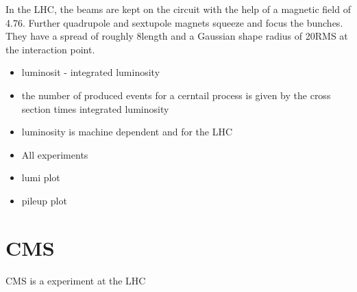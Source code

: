In the LHC, the beams are kept on the circuit with the help of a magnetic field of 4.76\tesla.
Further quadrupole and sextupole magnets squeeze and focus the bunches.
They have a spread of roughly 8\cm length and a Gaussian shape radius of 20\mum RMS at the interaction point.



\begin{itemize}
\item luminosit - integrated luminosity
\item the number of produced events for a cerntail process is given by the cross section times integrated luminosity
\item  luminosity is machine dependent and for the LHC
\item All experiments
\item lumi plot
\item pileup plot
\end{itemize}




\FloatBarrier
\chapter{CMS}

CMS is a experiment at the LHC

\FloatBarrier
